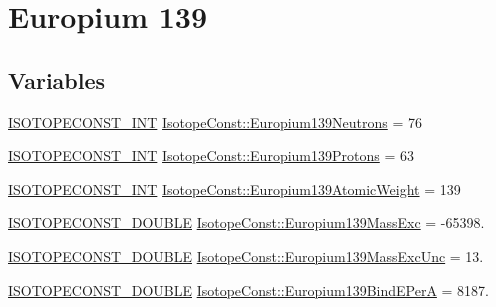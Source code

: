 \hypertarget{group___isotope_const-_europium-_eu139}{}\section{Europium 139}
\label{group___isotope_const-_europium-_eu139}
\subsection*{Variables}
\begin{DoxyCompactItemize}
\item 
\mbox{\hyperlink{group___isotope_const-_macros_ga5f18360b3e99483a35c32d789e62621c}{I\+S\+O\+T\+O\+P\+E\+C\+O\+N\+S\+T\+\_\+\+I\+NT}} \mbox{\hyperlink{group___isotope_const-_europium-_eu139_ga27d46a3d2b2e6ee7574260c6d6d11300}{Isotope\+Const\+::\+Europium139\+Neutrons}} = 76
\item 
\mbox{\hyperlink{group___isotope_const-_macros_ga5f18360b3e99483a35c32d789e62621c}{I\+S\+O\+T\+O\+P\+E\+C\+O\+N\+S\+T\+\_\+\+I\+NT}} \mbox{\hyperlink{group___isotope_const-_europium-_eu139_ga24133d5cb5e2e299751b5ecebb68d5e4}{Isotope\+Const\+::\+Europium139\+Protons}} = 63
\item 
\mbox{\hyperlink{group___isotope_const-_macros_ga5f18360b3e99483a35c32d789e62621c}{I\+S\+O\+T\+O\+P\+E\+C\+O\+N\+S\+T\+\_\+\+I\+NT}} \mbox{\hyperlink{group___isotope_const-_europium-_eu139_ga860aad02e2db25347fb8cb351b855322}{Isotope\+Const\+::\+Europium139\+Atomic\+Weight}} = 139
\item 
\mbox{\hyperlink{group___isotope_const-_macros_ga8f45a7272ce02c0b4c65c44636ed719a}{I\+S\+O\+T\+O\+P\+E\+C\+O\+N\+S\+T\+\_\+\+D\+O\+U\+B\+LE}} \mbox{\hyperlink{group___isotope_const-_europium-_eu139_ga3f6f95fb35b8e7882e673db1966d6c60}{Isotope\+Const\+::\+Europium139\+Mass\+Exc}} = -\/65398.
\item 
\mbox{\hyperlink{group___isotope_const-_macros_ga8f45a7272ce02c0b4c65c44636ed719a}{I\+S\+O\+T\+O\+P\+E\+C\+O\+N\+S\+T\+\_\+\+D\+O\+U\+B\+LE}} \mbox{\hyperlink{group___isotope_const-_europium-_eu139_ga72008ac48275c3a362d1e2b1a4644372}{Isotope\+Const\+::\+Europium139\+Mass\+Exc\+Unc}} = 13.
\item 
\mbox{\hyperlink{group___isotope_const-_macros_ga8f45a7272ce02c0b4c65c44636ed719a}{I\+S\+O\+T\+O\+P\+E\+C\+O\+N\+S\+T\+\_\+\+D\+O\+U\+B\+LE}} \mbox{\hyperlink{group___isotope_const-_europium-_eu139_gaff85e233baab358d86b763068267defe}{Isotope\+Const\+::\+Europium139\+Bind\+E\+PerA}} = 8187.
\item 

\end{DoxyCompactItemize}
